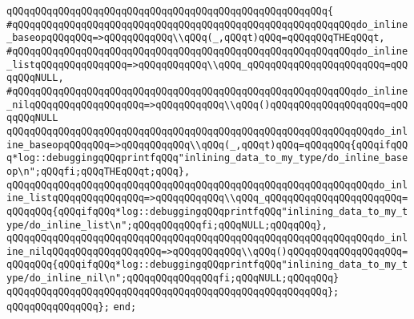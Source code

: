 \verb|qQQqqQQqqQQqqQQqqQQqqQQqqQQqqQQqqQQqqQQqqQQqqQQqqQQqqQQq{|\newline
\verb|#qQQqqQQqqQQqqQQqqQQqqQQqqQQqqQQqqQQqqQQqqQQqqQQqqQQqqQQqqQQqdo_inline_baseopqQQqqQQq=>qQQqqQQqqQQq\\qQQq(_,qQQqt)qQQq=qQQqqQQqTHEqQQqt,|\newline
\verb|#qQQqqQQqqQQqqQQqqQQqqQQqqQQqqQQqqQQqqQQqqQQqqQQqqQQqqQQqqQQqdo_inline_listqQQqqQQqqQQqqQQq=>qQQqqQQqqQQq\\qQQq_qQQqqQQqqQQqqQQqqQQqqQQq=qQQqqQQqNULL,|\newline
\verb|#qQQqqQQqqQQqqQQqqQQqqQQqqQQqqQQqqQQqqQQqqQQqqQQqqQQqqQQqqQQqdo_inline_nilqQQqqQQqqQQqqQQqqQQq=>qQQqqQQqqQQq\\qQQq()qQQqqQQqqQQqqQQqqQQq=qQQqqQQqNULL|\newline
\newline
\verb|qQQqqQQqqQQqqQQqqQQqqQQqqQQqqQQqqQQqqQQqqQQqqQQqqQQqqQQqqQQqqQQqdo_inline_baseopqQQqqQQq=>qQQqqQQqqQQq\\qQQq(_,qQQqt)qQQq=qQQqqQQq{qQQqifqQQq*log::debuggingqQQqprintfqQQq"inlining_data_to_my_type/do_inline_baseop\n";qQQqfi;qQQqTHEqQQqt;qQQq},|\newline
\verb|qQQqqQQqqQQqqQQqqQQqqQQqqQQqqQQqqQQqqQQqqQQqqQQqqQQqqQQqqQQqqQQqdo_inline_listqQQqqQQqqQQqqQQq=>qQQqqQQqqQQq\\qQQq_qQQqqQQqqQQqqQQqqQQqqQQq=qQQqqQQq{qQQqifqQQq*log::debuggingqQQqprintfqQQq"inlining_data_to_my_type/do_inline_list\n";qQQqqQQqqQQqfi;qQQqNULL;qQQqqQQq},|\newline
\verb|qQQqqQQqqQQqqQQqqQQqqQQqqQQqqQQqqQQqqQQqqQQqqQQqqQQqqQQqqQQqqQQqdo_inline_nilqQQqqQQqqQQqqQQqqQQq=>qQQqqQQqqQQq\\qQQq()qQQqqQQqqQQqqQQqqQQq=qQQqqQQq{qQQqifqQQq*log::debuggingqQQqprintfqQQq"inlining_data_to_my_type/do_inline_nil\n";qQQqqQQqqQQqqQQqfi;qQQqNULL;qQQqqQQq}|\newline
\verb|qQQqqQQqqQQqqQQqqQQqqQQqqQQqqQQqqQQqqQQqqQQqqQQqqQQqqQQq};|\newline
\verb|qQQqqQQqqQQqqQQq};|\newline
\verb|end;|\newline

